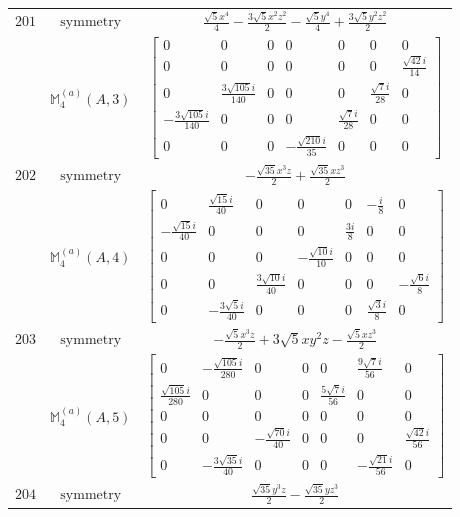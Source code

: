 \documentclass[fleqn,8pt,landscape]{jsarticle}
\begin{document}
\begin{longtable}{ccc}
$ 201 $ & $ \text{symmetry} $ & $ \frac{\sqrt{5} x^{4}}{4} - \frac{3 \sqrt{5} x^{2} z^{2}}{2} - \frac{\sqrt{5} y^{4}}{4} + \frac{3 \sqrt{5} y^{2} z^{2}}{2} $ \\
$  $ & $ \mathbb{M}_{4}^{(a)}(A,3) $ & $ \begin{bmatrix} 0 & 0 & 0 & 0 & 0 & 0 & 0 \\ 0 & 0 & 0 & 0 & 0 & 0 & \frac{\sqrt{42} i}{14} \\ 0 & \frac{3 \sqrt{105} i}{140} & 0 & 0 & 0 & \frac{\sqrt{7} i}{28} & 0 \\ - \frac{3 \sqrt{105} i}{140} & 0 & 0 & 0 & \frac{\sqrt{7} i}{28} & 0 & 0 \\ 0 & 0 & 0 & - \frac{\sqrt{210} i}{35} & 0 & 0 & 0 \end{bmatrix} $ \\ \hline
$ 202 $ & $ \text{symmetry} $ & $ - \frac{\sqrt{35} x^{3} z}{2} + \frac{\sqrt{35} x z^{3}}{2} $ \\
$  $ & $ \mathbb{M}_{4}^{(a)}(A,4) $ & $ \begin{bmatrix} 0 & \frac{\sqrt{15} i}{40} & 0 & 0 & 0 & - \frac{i}{8} & 0 \\ - \frac{\sqrt{15} i}{40} & 0 & 0 & 0 & \frac{3 i}{8} & 0 & 0 \\ 0 & 0 & 0 & - \frac{\sqrt{10} i}{10} & 0 & 0 & 0 \\ 0 & 0 & \frac{3 \sqrt{10} i}{40} & 0 & 0 & 0 & - \frac{\sqrt{6} i}{8} \\ 0 & - \frac{3 \sqrt{5} i}{40} & 0 & 0 & 0 & \frac{\sqrt{3} i}{8} & 0 \end{bmatrix} $ \\ \hline
$ 203 $ & $ \text{symmetry} $ & $ - \frac{\sqrt{5} x^{3} z}{2} + 3 \sqrt{5} x y^{2} z - \frac{\sqrt{5} x z^{3}}{2} $ \\
$  $ & $ \mathbb{M}_{4}^{(a)}(A,5) $ & $ \begin{bmatrix} 0 & - \frac{\sqrt{105} i}{280} & 0 & 0 & 0 & \frac{9 \sqrt{7} i}{56} & 0 \\ \frac{\sqrt{105} i}{280} & 0 & 0 & 0 & \frac{5 \sqrt{7} i}{56} & 0 & 0 \\ 0 & 0 & 0 & 0 & 0 & 0 & 0 \\ 0 & 0 & - \frac{\sqrt{70} i}{40} & 0 & 0 & 0 & \frac{\sqrt{42} i}{56} \\ 0 & - \frac{3 \sqrt{35} i}{40} & 0 & 0 & 0 & - \frac{\sqrt{21} i}{56} & 0 \end{bmatrix} $ \\ \hline
$ 204 $ & $ \text{symmetry} $ & $ \frac{\sqrt{35} y^{3} z}{2} - \frac{\sqrt{35} y z^{3}}{2} $ \\

\end{longtable}
\end{document}
